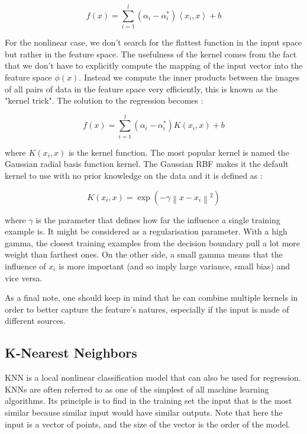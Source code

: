 \documentclass[11pt,a4paper,oneside]{book}
\begin{document}
\begin{equation}
f\left ( x \right ) = \sum_{i=1}^l \left ( \alpha_i - \alpha_i^* \right )\left \langle x_i, x \right \rangle + b
\end{equation}



For the nonlinear case, we don't search for the flattest function in the input space but rather in the feature space. The usefulness of the kernel comes from the fact that we don't have to explicitly compute the mapping of the input vector into the feature space $\phi(x)$. Instead we compute the inner products between the images of all pairs of data in the feature space very efficiently, this is known as the "kernel trick". The solution to the regression becomes :


\begin{equation}
f\left ( x \right ) = \sum_{i=1}^l \left ( \alpha_i - \alpha_i^* \right )K\left ( x_i, x \right ) + b
\end{equation}

where $K\left ( x_i, x \right )$ is the kernel function. The most popular kernel is named the Gaussian radial basis function kernel. The Gaussian RBF makes it the default kernel to use with no prior knowledge on the data and it is defined as : 

\begin{equation}
K\left ( x_i, x \right ) = \exp \left ( -\gamma \left \| x - x_i \right \|^2 \right )
\end{equation}

where $\gamma$\label{gamma} is the parameter that defines how far the influence a single training example is. It might be considered as a regularisation parameter. With a high gamma, the closest training examples from the decision boundary pull a lot more weight than farthest ones. On the other side, a small gamma means that the influence of $x_i$ is more important (and so imply large variance, small bias) and vice versa.

As a final note, one should keep in mind that he can combine multiple kernels in order to better capture the feature's natures, especially if the input is made of different sources.


\subsection{K-Nearest Neighbors}

KNN is a local nonlinear classification model that can also be used for regression. KNNs are often referred to as one of the simplest of all machine learning algorithms. Its principle is to find in the training set the input that is the most similar because similar input would have similar outputs. Note that here the input is a vector of points, and the size of the vector is the order of the model. 
\end{document}
